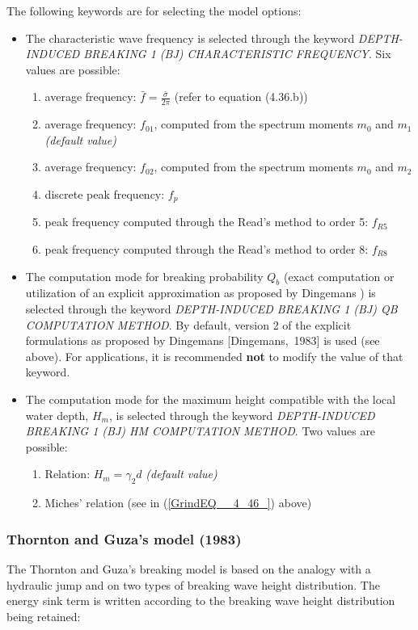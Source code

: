  The following keywords are for selecting the model options:

 \begin{itemize}
\item The characteristic wave frequency is selected through the keyword \textit{DEPTH-INDUCED BREAKING 1 (BJ) CHARACTERISTIC FREQUENCY}. Six values are possible:
\begin{enumerate}
 \item average frequency: $\bar{f}=\frac{\bar{\sigma }}{2\pi } $  (refer to equation (4.36.b))
 \item average frequency: $f_{01} $, computed from the spectrum moments $m_0$ and $m_1$ \textit{(default value)}
 \item average frequency: $f_{02} $, computed from the spectrum moments $m_0$ and $m_2$
 \item discrete peak frequency: $f_p$
 \item peak frequency computed through the Read's method to order 5: $f_{R5}$
 \item peak frequency computed through the Read's method to order 8: $f_{R8}$
\end{enumerate}

 \item The computation mode for breaking probability $Q_{b} $ (exact computation or utilization of an explicit approximation as proposed by Dingemans \cite{Dingemans1983}) is selected through the keyword \textit{DEPTH-INDUCED BREAKING 1 (BJ) QB COMPUTATION METHOD}. By default, version 2 of the explicit formulations as proposed by Dingemans [Dingemans,~1983] is used (see above). For applications, it is recommended \textbf{not} to modify the value of that keyword.

 \item The computation mode for the maximum height compatible with the local water depth, $H_{m} $, is selected through the keyword \textit{DEPTH-INDUCED BREAKING 1 (BJ) HM COMPUTATION METHOD}. Two values are possible:
\begin{enumerate}
 \item Relation: $H_{m} =\gamma _{2} d$  \textit{(default value)}
 \item Miches' relation (see in (\ref{GrindEQ__4_46_}) above)
\end{enumerate}
\end{itemize}

\subsubsection{Thornton and Guza's model (1983)}
\label{parag4.3.5.2}
 The Thornton and Guza's breaking model \cite{Thornton1983} is based on the analogy with a hydraulic jump and on two types of breaking wave height distribution. The energy sink term is written according to the breaking wave height distribution being retained:


